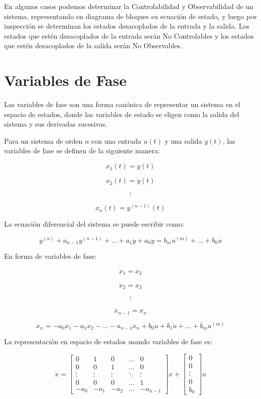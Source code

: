 \documentclass[legalpaper,twocolumn]{article}
\begin{document}
En algunos casos podemos determinar la Controlabilidad y Observabilidad de un sistema, representando en diagrama de bloques su ecuación de estado, y luego por inspección se determinan los estados desacoplados de la entrada y la salida. Los estados que estén desacoplados de la entrada serán No Controlables y los estados que estén desacoplados de la salida serán No Observables.

\section*{Variables de Fase}

Las variables de fase son una forma canónica de representar un sistema en el espacio de estados, donde las variables de estado se eligen como la salida del sistema y sus derivadas sucesivas.

Para un sistema de orden \( n \) con una entrada \( u(t) \) y una salida \( y(t) \), las variables de fase se definen de la siguiente manera:

\[
    x_1(t) = y(t)
\]

\[
    x_2(t) = \dot{y}(t)
\]

\[
    \vdots
\]

\[
    x_n(t) = y^{(n-1)}(t)
\]

La ecuación diferencial del sistema se puede escribir como:

\[
    y^{(n)} + a_{n-1} y^{(n-1)} + \dots + a_1 \dot{y} + a_0 y = b_m u^{(m)} + \dots + b_0 u
\]

En forma de variables de fase:

\[
    \dot{x}_1 = x_2
\]

\[
    \dot{x}_2 = x_3
\]

\[
    \vdots
\]

\[
    \dot{x}_{n-1} = x_n
\]

\[
    \dot{x}_n = -a_0 x_1 - a_1 x_2 - \dots - a_{n-1} x_n + b_0 u + b_1 \dot{u} + \dots + b_m u^{(m)}
\]

La representación en espacio de estados usando variables de fase es:

\[
    \dot{x} = \begin{bmatrix}
        0      & 1      & 0      & \dots  & 0        \\
        0      & 0      & 1      & \dots  & 0        \\
        \vdots & \vdots & \vdots & \ddots & \vdots   \\
        0      & 0      & 0      & \dots  & 1        \\
        -a_0   & -a_1   & -a_2   & \dots  & -a_{n-1}
    \end{bmatrix} x + \begin{bmatrix}
        0      \\
        0      \\
        \vdots \\
        0      \\
        b_0
    \end{bmatrix} u
\]
\end{document}
